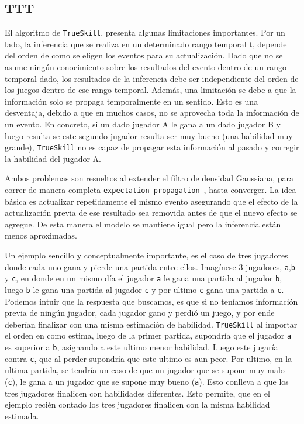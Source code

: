 \documentclass[11pt,twoside, spanish]{report} %
\begin{document}
\subsection{TTT}


El algoritmo de \texttt{TrueSkill}, presenta algunas limitaciones importantes.
Por un lado, la inferencia que se realiza en un determinado rango temporal t, depende del orden de como se eligen los eventos para su actualizaci\'on.
Dado que no se asume ning\'un conocimiento sobre los resultados del evento dentro de un rango temporal dado, los resultados de la inferencia debe ser independiente del orden de los juegos dentro de ese rango temporal.
Adem\'as, una limitaci\'on se debe a que la informaci\'on solo se propaga temporalmente en un sentido.
Esto es una desventaja, debido a que en muchos casos, no se aprovecha toda la informaci\'on de un evento.
En concreto, si un dado jugador A le gana a un dado jugador B y luego resulta se este segundo jugador resulta ser muy bueno (una habilidad muy grande), \texttt{TrueSkill} no es capaz de propagar esta informaci\'on al pasado y corregir la habilidad del jugador A.

Ambos problemas son resueltos al extender el filtro de densidad Gaussiana, para correr de manera completa \texttt{expectation propagation}~\cite{herbrich2005}, hasta converger.
La idea b\'asica es actualizar repetidamente el mismo evento asegurando que el efecto de la actualizaci\'on previa de ese resultado sea removida antes de que el nuevo efecto se agregue.
De esta manera el modelo se mantiene igual pero la inferencia est\'an menos aproximadas.

Un ejemplo sencillo y conceptualmente importante, es el caso de tres jugadores donde cada uno gana y pierde una partida entre ellos.
Imag\'inese 3 jugadores, \texttt{a},\texttt{b} y \texttt{c}, en donde en un mismo d\'ia el jugador \texttt{a} le gana una partida al jugador \texttt{b}, luego \texttt{b} le gana una partida al jugador \texttt{c} y por ultimo \texttt{c} gana una partida a \texttt{c}.
Podemos intuir que la respuesta que buscamos, es que si no ten\'iamos informaci\'on previa de ning\'un jugador, cada jugador gano y perdi\'o un juego, y por ende deber\'ian finalizar con una misma estimaci\'on de habilidad.
\texttt{TrueSkill} al importar el orden en como estima, luego de la primer partida, supondr\'ia que el jugador \texttt{a} es superior a \texttt{b}, asignando a este ultimo menor habilidad.
Luego este jugar\'ia contra \texttt{c}, que al perder supondr\'ia que este ultimo es aun peor.
Por ultimo, en la ultima partida, se tendr\'ia un caso de que un jugador que se supone muy malo (\texttt{c}), le gana a un jugador que se supone muy bueno (\texttt{a}).
Esto conlleva a que los tres jugadores finalicen con habilidades diferentes.
Esto permite, que en el ejemplo reci\'en contado los tres jugadores finalicen con la misma habilidad estimada.
\end{document}
